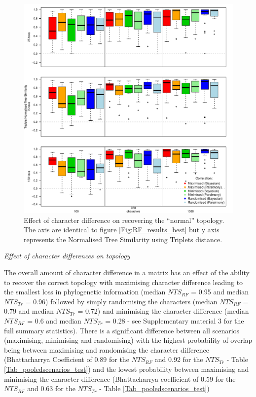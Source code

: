 \documentclass[12pt,letterpaper]{article}
\renewcommand{\subsection}[1]{%
\bigskip
\begin{center}
\begin{large}
\normalfont\itshape #1
\end{large}
\end{center}}
\begin{document}
\begin{figure}[!htbp]
\centering
   \includegraphics[width=1\textwidth]{Figures/Tr_results_best.pdf} %
\caption{Effect of character difference on recovering the ``normal'' topology. The axis are identical to figure \ref{Fig:RF_results_best} but y axis represents the Normalised Tree Similarity using Triplets distance.}
\label{Fig:Tr_results_best}
\end{figure}

\subsection{Effect of character differences on topology}

The overall amount of character difference in a matrix has an effect of the ability to recover the correct topology with maximising character difference leading to the smallest loss in phylogenetic information (median $NTS_{RF}$ = 0.95 and median $NTS_{Tr}$ = 0.96) followed by simply randomising the characters (median $NTS_{RF}$ = 0.79 and median $NTS_{Tr}$ = 0.72) and minimising the character difference (median $NTS_{RF}$ = 0.6 and median $NTS_{Tr}$ = 0.28 - see Supplementary material 3 for the full summary statistics).
There is a significant difference between all scenarios (maximising, minimising and randomising) with the highest probability of overlap being between maximising and randomising the character difference (Bhattacharrya Coefficient of 0.89 for the $NTS_{RF}$ and 0.92 for the $NTS_{Tr}$ - Table \ref{Tab_pooledscenarios_test}) and the lowest probability between maximising and minimising the character difference (Bhattacharrya coefficient of 0.59 for the $NTS_{RF}$ and 0.63 for the $NTS_{Tr}$ - Table \ref{Tab_pooledscenarios_test})
\end{document}
